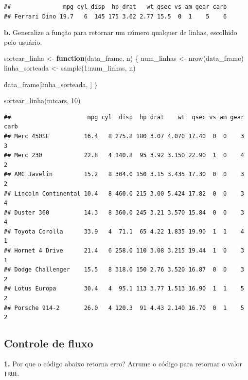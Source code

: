 \documentclass[
]{book}
\newenvironment{Shaded}{\begin{snugshade}}{\end{snugshade}}
\newcommand{\ControlFlowTok}[1]{\textcolor[rgb]{0.13,0.29,0.53}{\textbf{#1}}}
\newcommand{\DecValTok}[1]{\textcolor[rgb]{0.00,0.00,0.81}{#1}}
\newcommand{\FunctionTok}[1]{\textcolor[rgb]{0.00,0.00,0.00}{#1}}
\newcommand{\NormalTok}[1]{#1}
\newcommand{\OtherTok}[1]{\textcolor[rgb]{0.56,0.35,0.01}{#1}}
\newcommand{\SpecialCharTok}[1]{\textcolor[rgb]{0.00,0.00,0.00}{#1}}
\begin{document}
\begin{verbatim}
##               mpg cyl disp  hp drat   wt qsec vs am gear carb
## Ferrari Dino 19.7   6  145 175 3.62 2.77 15.5  0  1    5    6
\end{verbatim}

\textbf{b.} Generalize a função para retornar um número qualquer de linhas, escolhido pelo usuário.

\begin{Shaded}
\begin{Highlighting}[]
\NormalTok{sortear\_linha }\OtherTok{\textless{}{-}} \ControlFlowTok{function}\NormalTok{(data\_frame, n) \{}
\NormalTok{  num\_linhas }\OtherTok{\textless{}{-}} \FunctionTok{nrow}\NormalTok{(data\_frame)}
\NormalTok{  linha\_sorteada }\OtherTok{\textless{}{-}} \FunctionTok{sample}\NormalTok{(}\DecValTok{1}\SpecialCharTok{:}\NormalTok{num\_linhas, n)}
  
\NormalTok{  data\_frame[linha\_sorteada, ]}
\NormalTok{\}}

\FunctionTok{sortear\_linha}\NormalTok{(mtcars, }\DecValTok{10}\NormalTok{)}
\end{Highlighting}
\end{Shaded}

\begin{verbatim}
##                      mpg cyl  disp  hp drat    wt  qsec vs am gear carb
## Merc 450SE          16.4   8 275.8 180 3.07 4.070 17.40  0  0    3    3
## Merc 230            22.8   4 140.8  95 3.92 3.150 22.90  1  0    4    2
## AMC Javelin         15.2   8 304.0 150 3.15 3.435 17.30  0  0    3    2
## Lincoln Continental 10.4   8 460.0 215 3.00 5.424 17.82  0  0    3    4
## Duster 360          14.3   8 360.0 245 3.21 3.570 15.84  0  0    3    4
## Toyota Corolla      33.9   4  71.1  65 4.22 1.835 19.90  1  1    4    1
## Hornet 4 Drive      21.4   6 258.0 110 3.08 3.215 19.44  1  0    3    1
## Dodge Challenger    15.5   8 318.0 150 2.76 3.520 16.87  0  0    3    2
## Lotus Europa        30.4   4  95.1 113 3.77 1.513 16.90  1  1    5    2
## Porsche 914-2       26.0   4 120.3  91 4.43 2.140 16.70  0  1    5    2
\end{verbatim}

\hypertarget{controle-de-fluxo-1}{%
\subsection*{Controle de fluxo}\label{controle-de-fluxo-1}}

\textbf{1.} Por que o código abaixo retorna erro? Arrume o código para retornar o valor \texttt{TRUE}.
\end{document}
